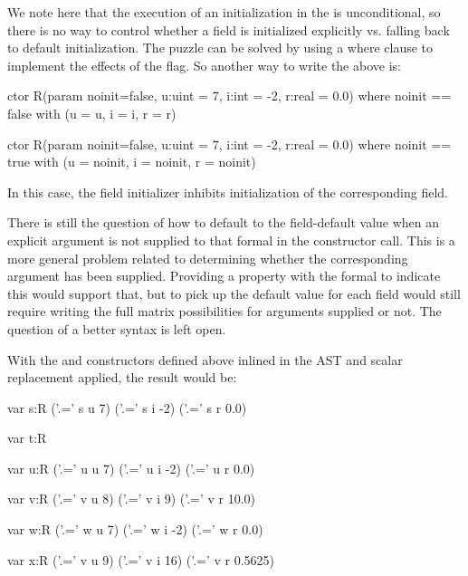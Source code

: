 We note here that the execution of an initialization in the  is
unconditional, so there is no way to control whether a field is initialized explicitly
vs. falling back to default initialization.  The puzzle can be solved by using a where
clause to implement the effects of the  flag.  So another way to write the
above is:
\begin{chapel}
  ctor R(param noinit=false, u:uint = 7, i:int = -2, r:real = 0.0)
    where noinit == false
    with (u = u, i = i, r = r)
  { }

  ctor R(param noinit=false, u:uint = 7, i:int = -2, r:real = 0.0)
    where noinit == true
    with (u = noinit, i = noinit, r = noinit)
  { }
\end{chapel}
\noindent
In this case, the  field initializer inhibits initialization of the
corresponding field.  

There is still the question of how to default to the field-default value when an explicit
argument is not supplied to that formal in the constructor call.  This is a more general
problem related to determining whether the corresponding argument has been supplied.
Providing a property with the formal to indicate this would support that, but to pick up
the default value for each field would still require writing the full matrix
possibilities for arguments supplied or not.  The question of a better syntax is left open.

With the  and constructors defined above inlined in the AST and scalar
replacement applied, the result would be:
\begin{numberedchapel}
  var s:R
  ('.=' s u 7)
  ('.=' s i -2)
  ('.=' s r 0.0)

  var t:R

  var u:R
  ('.=' u u 7)
  ('.=' u i -2)
  ('.=' u r 0.0)

  var v:R
  ('.=' v u 8)
  ('.=' v i 9)
  ('.=' v r 10.0)

  var w:R
  ('.=' w u 7)
  ('.=' w i -2)
  ('.=' w r 0.0)

  var x:R
  ('.=' v u 9)
  ('.=' v i 16)
  ('.=' v r 0.5625)
\end{numberedchapel}


